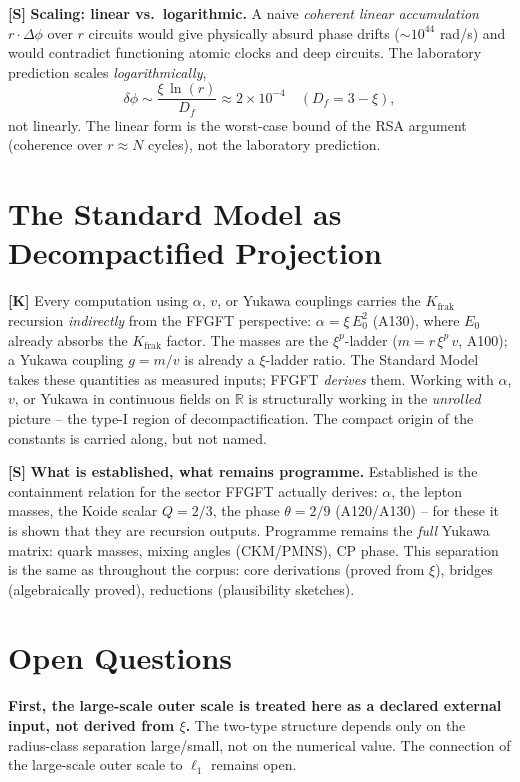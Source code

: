 \textbf{[S]} \textbf{Scaling: linear vs.\ logarithmic.} A naive \emph{coherent
linear accumulation} $r\cdot\Delta\phi$ over $r$ circuits would give physically
absurd phase drifts ($\sim10^{44}$ rad/s) and would contradict functioning atomic
clocks and deep circuits. The laboratory prediction scales \emph{logarithmically},
\[
  \delta\phi\sim\frac{\xi\,\ln(r)}{D_f}\approx2\times10^{-4}
  \quad (D_f=3-\xi),
\]
not linearly. The linear form is the worst-case bound of the RSA argument
(coherence over $r\approx N$ cycles), not the laboratory prediction.

\section{The Standard Model as Decompactified Projection}

\textbf{[K]} Every computation using $\alpha$, $v$, or Yukawa couplings carries
the $K_\text{frak}$ recursion \emph{indirectly} from the FFGFT perspective:
$\alpha=\xi\,E_0^2$ (A130), where $E_0$ already absorbs the $K_\text{frak}$ factor.
The masses are the $\xi^p$-ladder ($m=r\,\xi^p\,v$, A100); a Yukawa coupling
$g=m/v$ is already a $\xi$-ladder ratio. The Standard Model takes these quantities
as measured inputs; FFGFT \emph{derives} them. Working with $\alpha$, $v$, or
Yukawa in continuous fields on $\mathbb{R}$ is structurally working in the
\emph{unrolled} picture -- the type-I region of decompactification. The compact
origin of the constants is carried along, but not named.

\textbf{[S]} \textbf{What is established, what remains programme.} Established is
the containment relation for the sector FFGFT actually derives: $\alpha$, the
lepton masses, the Koide scalar $Q=2/3$, the phase $\theta=2/9$ (A120/A130) -- for
these it is shown that they are recursion outputs. Programme remains the \emph{full}
Yukawa matrix: quark masses, mixing angles (CKM/PMNS), CP phase. This separation
is the same as throughout the corpus: core derivations (proved from $\xi$), bridges
(algebraically proved), reductions (plausibility sketches).

\section{Open Questions}

\textbf{First, the large-scale outer scale is treated here as a declared external
input, not derived from $\xi$.} The two-type structure depends only on the
radius-class separation large/small, not on the numerical value. The connection
of the large-scale outer scale to $\ell_1$ remains open.

